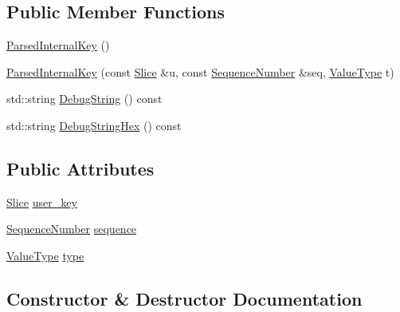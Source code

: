 \subsection*{Public Member Functions}
\begin{DoxyCompactItemize}
\item 
\hyperlink{structleveldb_1_1_parsed_internal_key_a23885ae8c8ccb36e01cdb3469ea21d67}{Parsed\+Internal\+Key} ()
\item 
\hyperlink{structleveldb_1_1_parsed_internal_key_acc24f6ddeb4223d0484613076a48a9a1}{Parsed\+Internal\+Key} (const \hyperlink{classleveldb_1_1_slice}{Slice} \&u, const \hyperlink{namespaceleveldb_a5481ededd221c36d652c371249f869fa}{Sequence\+Number} \&seq, \hyperlink{namespaceleveldb_acc038cb0d608414730cafa459a4ba866}{Value\+Type} t)
\item 
std\+::string \hyperlink{structleveldb_1_1_parsed_internal_key_abda4655ea6857f75dcb8f409873207d5}{Debug\+String} () const 
\item 
std\+::string \hyperlink{structleveldb_1_1_parsed_internal_key_abe071a64c182073e4531cd78fd5a7078}{Debug\+String\+Hex} () const 
\end{DoxyCompactItemize}
\subsection*{Public Attributes}
\begin{DoxyCompactItemize}
\item 
\hyperlink{classleveldb_1_1_slice}{Slice} \hyperlink{structleveldb_1_1_parsed_internal_key_aa6e30fcf3c95fc1485d60fa08efe2b9d}{user\+\_\+key}
\item 
\hyperlink{namespaceleveldb_a5481ededd221c36d652c371249f869fa}{Sequence\+Number} \hyperlink{structleveldb_1_1_parsed_internal_key_a3ab7f4382bc026081875fde4dea95e61}{sequence}
\item 
\hyperlink{namespaceleveldb_acc038cb0d608414730cafa459a4ba866}{Value\+Type} \hyperlink{structleveldb_1_1_parsed_internal_key_ac7c10a6f60f93982b886ad1fbbafd6c2}{type}
\end{DoxyCompactItemize}


\subsection{Constructor \& Destructor Documentation}
\hypertarget{structleveldb_1_1_parsed_internal_key_a23885ae8c8ccb36e01cdb3469ea21d67}{}
